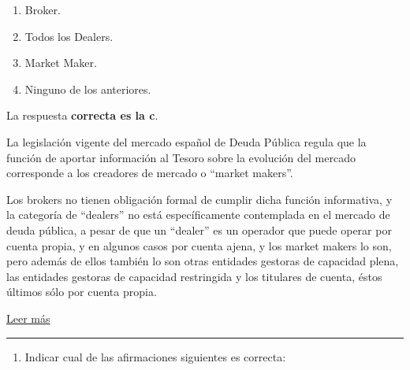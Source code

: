\documentclass[
  letterpaper,
  DIV=11,
  numbers=noendperiod]{scrreprt}
\providecommand{\tightlist}{%
  \setlength{\itemsep}{0pt}\setlength{\parskip}{0pt}}\usepackage{longtable,booktabs,array}
\begin{document}
\begin{enumerate}
\def\labelenumi{\alph{enumi})}
\item
  Broker.
\item
  Todos los Dealers.
\item
  Market Maker.
\item
  Ninguno de los anteriores.
\end{enumerate}

\begin{tcolorbox}[enhanced jigsaw, left=2mm, opacityback=0, colback=white, breakable, arc=.35mm, bottomrule=.15mm, rightrule=.15mm, toprule=.15mm, leftrule=.75mm, colframe=quarto-callout-tip-color-frame]
\begin{minipage}[t]{5.5mm}
\textcolor{quarto-callout-tip-color}{\faLightbulb}
\end{minipage}%
\begin{minipage}[t]{\textwidth - 5.5mm}

La respuesta \textbf{correcta es la c}.

La legislación vigente del mercado español de Deuda Pública regula que
la función de aportar información al Tesoro sobre la evolución del
mercado corresponde a los creadores de mercado o ``market makers''.

Los brokers no tienen obligación formal de cumplir dicha función
informativa, y la categoría de ``dealers'' no está específicamente
contemplada en el mercado de deuda pública, a pesar de que un ``dealer''
es un operador que puede operar por cuenta propia, y en algunos casos
por cuenta ajena, y los market makers lo son, pero además de ellos
también lo son otras entidades gestoras de capacidad plena, las
entidades gestoras de capacidad restringida y los titulares de cuenta,
éstos últimos sólo por cuenta propia.

\href{http://www.tesoro.es/deuda-publica/mercado/participantes/creadores-de-mercado/creadores-de-mercado-de-bonos-y-obligaciones-del-estado/obligaciones-del-creador-de-mercado-de-bonos-y-obligaciones}{Leer
más}

\end{minipage}%
\end{tcolorbox}

\begin{center}\rule{0.5\linewidth}{0.5pt}\end{center}

\begin{enumerate}
\def\labelenumi{\arabic{enumi}.}
\setcounter{enumi}{14}
\tightlist
\item
  Indicar cual de las afirmaciones siguientes es correcta:
\end{enumerate}
\end{document}

